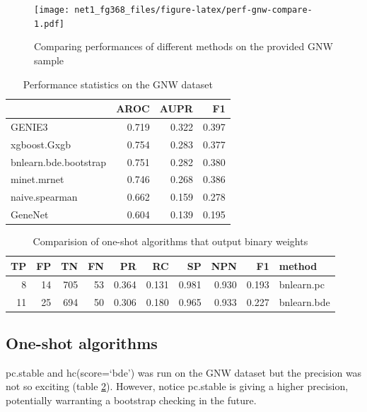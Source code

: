 \documentclass[]{article}
\theoremstyle{definition}
\theoremstyle{definition}
\theoremstyle{definition}
\theoremstyle{remark}
\begin{document}
\begin{figure}
\centering
\texttt{[image: net1\_fg368\_files/figure-latex/perf-gnw-compare-1.pdf]}
\caption{\label{fig:perf-gnw-compare}Comparing performances of different
methods on the provided GNW sample}
\end{figure}

\begin{table}

\caption{\label{tab:perf-gnw}Performance statistics on the GNW dataset}
\centering
\begin{tabular}[t]{l|r|r|r}
\hline
  & AROC & AUPR & F1\\
\hline
GENIE3 & 0.719 & 0.322 & 0.397\\
\hline
xgboost.Gxgb & 0.754 & 0.283 & 0.377\\
\hline
bnlearn.bde.bootstrap & 0.751 & 0.282 & 0.380\\
\hline
minet.mrnet & 0.746 & 0.268 & 0.386\\
\hline
naive.spearman & 0.662 & 0.159 & 0.278\\
\hline
GeneNet & 0.604 & 0.139 & 0.195\\
\hline
\end{tabular}
\end{table}

\begin{table}

\caption{\label{tab:one-shot}Comparision of one-shot algorithms that output binary weights}
\centering
\begin{tabular}[t]{r|r|r|r|r|r|r|r|r|l}
\hline
TP & FP & TN & FN & PR & RC & SP & NPN & F1 & method\\
\hline
8 & 14 & 705 & 53 & 0.364 & 0.131 & 0.981 & 0.930 & 0.193 & bnlearn.pc\\
\hline
11 & 25 & 694 & 50 & 0.306 & 0.180 & 0.965 & 0.933 & 0.227 & bnlearn.bde\\
\hline
\end{tabular}
\end{table}

\subsection{One-shot algorithms}\label{one-shot-algorithms}

pc.stable and hc(score=`bde') was run on the GNW dataset but the
precision was not so exciting (table \ref{tab:one-shot}). However,
notice pc.stable is giving a higher precision, potentially warranting a
bootstrap checking in the future.
\end{document}
